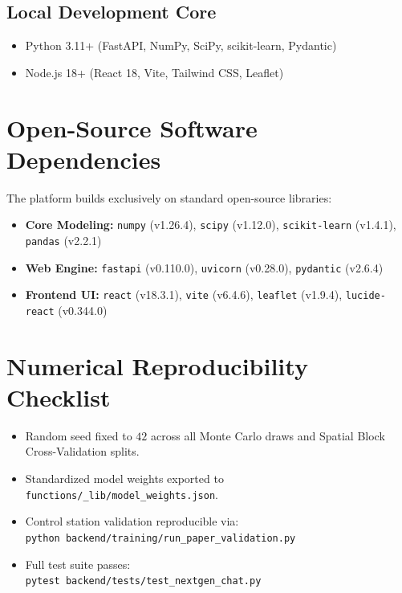 \documentclass[10pt,twocolumn]{article}
\begin{document}
\subsection{Local Development Core}
\begin{itemize}[leftmargin=*]
  \item Python 3.11+ (FastAPI, NumPy, SciPy, scikit-learn, Pydantic)
  \item Node.js 18+ (React 18, Vite, Tailwind CSS, Leaflet)
\end{itemize}

\section{Open-Source Software Dependencies}
The platform builds exclusively on standard open-source libraries:
\begin{itemize}[leftmargin=*]
  \item \textbf{Core Modeling:} \texttt{numpy} (v1.26.4), \texttt{scipy} (v1.12.0), \texttt{scikit-learn} (v1.4.1), \texttt{pandas} (v2.2.1)
  \item \textbf{Web Engine:} \texttt{fastapi} (v0.110.0), \texttt{uvicorn} (v0.28.0), \texttt{pydantic} (v2.6.4)
  \item \textbf{Frontend UI:} \texttt{react} (v18.3.1), \texttt{vite} (v6.4.6), \texttt{leaflet} (v1.9.4), \texttt{lucide-react} (v0.344.0)
\end{itemize}

\section{Numerical Reproducibility Checklist}
\begin{itemize}[leftmargin=*]
  \item Random seed fixed to $42$ across all Monte Carlo draws and Spatial Block Cross-Validation splits.
  \item Standardized model weights exported to \texttt{functions/\_lib/model\_weights.json}.
  \item Control station validation reproducible via: \\
  \texttt{python backend/training/run\_paper\_validation.py}
  \item Full test suite passes: \\
  \texttt{pytest backend/tests/test\_nextgen\_chat.py}
\end{itemize}
\end{document}
